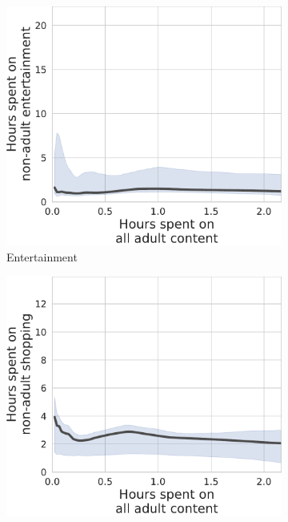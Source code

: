 \documentclass[12pt,twoside]{article}
\begin{document}
\begin{figure}[!ht]
\caption{Time Spent on Online Pornography vs. Non-adult Leisure}
\label{fig:tu_prop_entertainment-prop_adult_duration}
     \centering
     \begin{subfigure}[b]{0.495\textwidth}
         \centering
         \includegraphics[width=\textwidth]{figs/tu_duration_entertainment-duration_adult.pdf}
         \caption{Entertainment}
     \end{subfigure}
     \hfill
     \begin{subfigure}[b]{0.495\textwidth}
         \centering
         \includegraphics[width=\textwidth]{figs/tu_duration_shop-duration_adult.pdf}

\end{subfigure}
\end{figure}
\end{document}
